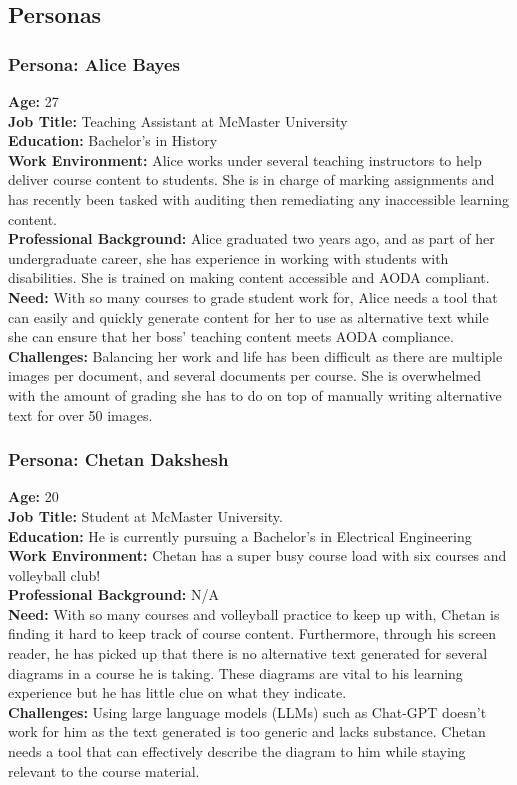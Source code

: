 \documentclass[12pt]{article}
\begin{document}
\subsection{Personas}
\subsubsection*{Persona: Alice Bayes}
\textbf{Age:} 27 \\
\textbf{Job Title:} Teaching Assistant at McMaster University\\
\textbf{Education:} Bachelor's in History\\
\textbf{Work Environment:} Alice works under several teaching
instructors to help deliver course content to students. She is in
charge of marking assignments and has recently been tasked with
auditing then remediating any inaccessible learning content. \\
\textbf{Professional Background:} Alice graduated two years ago, and
as part of her undergraduate career, she has experience in working
with students with disabilities. She is trained on making content
accessible and AODA compliant.\\[2mm]
\textbf{Need:} With so many courses to grade student work for, Alice
needs a tool that can easily and quickly generate content for her to
use as alternative text while she can ensure that her boss' teaching
content meets AODA compliance.\\
\textbf{Challenges:} Balancing her work and life has been difficult
as there are multiple images per document, and several documents per
course. She is overwhelmed with the amount of grading she has to do
on top of manually writing alternative text for over 50 images.

\subsubsection*{Persona: Chetan Dakshesh}
\textbf{Age:} 20 \\
\textbf{Job Title:} Student at McMaster University.\\
\textbf{Education:} He is currently pursuing a Bachelor's in
Electrical Engineering\\
\textbf{Work Environment:} Chetan has a super busy course load with
six courses and volleyball club!\\
\textbf{Professional Background:} N/A\\[2mm]
\textbf{Need:} With so many courses and volleyball practice to keep
up with, Chetan is finding it hard to keep track of course content.
Furthermore, through his screen reader, he has picked up that there
is no alternative text generated for several diagrams in a course he
is taking. These diagrams are vital to his learning experience but he
has little clue on what they indicate. \\
\textbf{Challenges:} Using large language models (LLMs) such as
Chat-GPT doesn't work for him as the text generated is too generic
and lacks substance. Chetan needs a tool that can effectively
describe the diagram to him while staying relevant to the course material.
\end{document}
